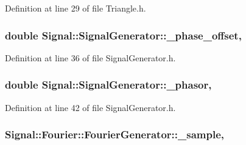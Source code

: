 Definition at line 29 of file Triangle.\+h.

\hypertarget{classSignal_1_1SignalGenerator_a6b4444d46747c8517171edbbf4b5588f}{
\subsubsection[{\+\_\+phase\+\_\+offset}]{\setlength{\rightskip}{0pt plus 5cm}double Signal\+::\+Signal\+Generator\+::\+\_\+phase\+\_\+offset\hspace{0.3cm}{\ttfamily [protected]}, {\ttfamily [inherited]}}}\label{classSignal_1_1SignalGenerator_a6b4444d46747c8517171edbbf4b5588f}


Definition at line 36 of file Signal\+Generator.\+h.

\hypertarget{classSignal_1_1SignalGenerator_af4aa0728ded00777be26a06d883eaeb3}{
\subsubsection[{\+\_\+phasor}]{\setlength{\rightskip}{0pt plus 5cm}double Signal\+::\+Signal\+Generator\+::\+\_\+phasor\hspace{0.3cm}{\ttfamily [protected]}, {\ttfamily [inherited]}}}\label{classSignal_1_1SignalGenerator_af4aa0728ded00777be26a06d883eaeb3}


Definition at line 42 of file Signal\+Generator.\+h.

\hypertarget{classSignal_1_1Fourier_1_1FourierGenerator_ad720bf2b268dc621ace64c54c0816597}{
\subsubsection[{\+\_\+sample}]{ Signal\+::\+Fourier\+::\+Fourier\+Generator\+::\+\_\+sample\hspace{0.3cm}{\ttfamily [protected]}, {\ttfamily [inherited]}}}\label{classSignal_1_1Fourier_1_1FourierGenerator_ad720bf2b268dc621ace64c54c0816597}


